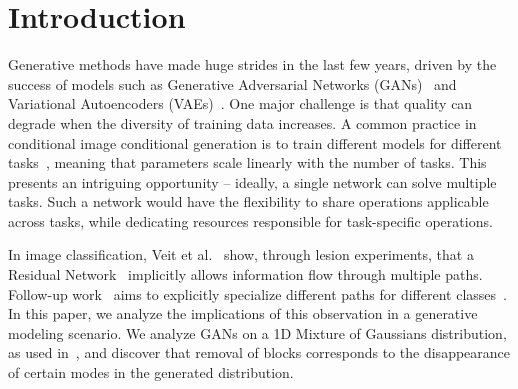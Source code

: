 \section{Introduction}
Generative methods have made huge strides in the last few years, driven by the success of models such as Generative Adversarial Networks (GANs)~\cite{goodfellow2014generative} and Variational Autoencoders (VAEs)~\cite{kingma2013auto}.
One major challenge is that quality can degrade when the diversity of training data increases.
A common practice in conditional image conditional generation is to train different models for different tasks~\cite{isola2016image2image,karras2017progressive,zhu2017toward,zhu2017unpaired,wang2017high,wang2018video}, meaning that parameters scale linearly with the number of tasks.
This presents an intriguing opportunity -- ideally, a single network can solve multiple tasks. Such a network would have the flexibility to share operations applicable across tasks, while dedicating resources responsible for task-specific operations.

In image classification, Veit et al.~\cite{veit2016residual} show, through lesion experiments, that a Residual Network~\cite{he2016deep} implicitly allows information flow through multiple paths. Follow-up work~\cite{veit2018adaptive} aims to explicitly specialize different paths for different classes~\cite{veit2018adaptive}.
In this paper, we analyze the implications of this observation in a generative modeling scenario. 
We analyze GANs on a 1D Mixture of Gaussians distribution, as used in~\cite{ghosh2017multi}, and discover that removal of blocks corresponds to the disappearance of certain modes in the generated distribution.

